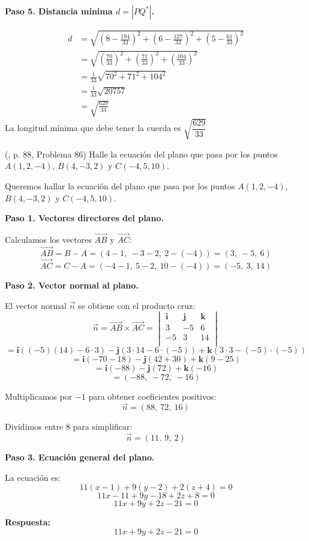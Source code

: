 \begin{prob}
\begin{myproof}
\textbf{Paso 5. Distancia mínima $d = |PQ^*|$.}

\begin{align*}
d &= \sqrt{\left(8 - \frac{194}{33}\right)^2 + \left(6 - \frac{127}{33}\right)^2 + \left(5 - \frac{61}{33}\right)^2}\\
&= \sqrt{\left(\frac{70}{33}\right)^2 + \left(\frac{71}{33}\right)^2 + \left(\frac{104}{33}\right)^2}\\
&= \frac{1}{33} \sqrt{70^2 + 71^2 + 104^2}\\
&= \frac{1}{33}\sqrt{20757}\\
&= \sqrt{\frac{629}{33}}
\end{align*}
La longitud mínima que debe tener la cuerda es \(\boxed{\sqrt{\dfrac{629}{33}}}
\)
\end{myproof}

\end{prob}

\begin{prob} (\cite{espinoza2006Algebralineal}, p. 88, Problema 86) Halle la ecuación del plano que pasa por los puntos $A(1,2,-4)$, $B(4,-3,2)$ y $C(-4,5,10)$. 

\begin{myproof}
Queremos hallar la ecuación del plano que pasa por los puntos $A(1,2,-4)$, $B(4,-3,2)$ y $C(-4,5,10)$.

\textbf{Paso 1. Vectores directores del plano.}

Calculamos los vectores $\vec{AB}$ y $\vec{AC}$:
\[
\vec{AB} = B - A = (4-1,\ -3-2,\ 2-(-4)) = (3,\ -5,\ 6)
\]
\[
\vec{AC} = C - A = (-4-1,\ 5-2,\ 10-(-4)) = (-5,\ 3,\ 14)
\]

\textbf{Paso 2. Vector normal al plano.}

El vector normal $\vec{n}$ se obtiene con el producto cruz:
\[
\vec{n} = \vec{AB} \times \vec{AC}
= \begin{vmatrix}
\mathbf{i} & \mathbf{j} & \mathbf{k} \\
3 & -5 & 6 \\
-5 & 3 & 14 \\
\end{vmatrix}
\]
\[
= \mathbf{i}((-5)(14) - 6 \cdot 3) - \mathbf{j}(3 \cdot 14 - 6 \cdot (-5)) + \mathbf{k}(3 \cdot 3 - (-5) \cdot (-5))
\]
\[
= \mathbf{i}(-70 - 18) - \mathbf{j}(42 + 30) + \mathbf{k}(9 - 25)
\]
\[
= \mathbf{i}(-88) - \mathbf{j}(72) + \mathbf{k}(-16)
\]
\[
= (-88,\ -72,\ -16)
\]

Multiplicamos por $-1$ para obtener coeficientes positivos:
\[
\vec{n} = (88,\ 72,\ 16)
\]

Dividimos entre $8$ para simplificar:
\[
\vec{n} = (11,\ 9,\ 2)
\]

\textbf{Paso 3. Ecuación general del plano.}

La ecuación es:
\[
11(x - 1) + 9(y - 2) + 2(z + 4) = 0
\]
\[
11x - 11 + 9y - 18 + 2z + 8 = 0
\]
\[
11x + 9y + 2z - 21 = 0
\]

\textbf{Respuesta:}
\[
\boxed{11x + 9y + 2z - 21 = 0}
\]
\end{myproof}

\end{prob}

